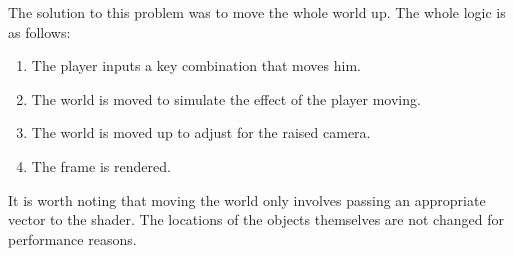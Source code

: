The solution to this problem was to move the whole world up.
The whole logic is as follows:
\begin{enumerate}
    \item The player inputs a key combination that moves him.
    \item The world is moved to simulate the effect of the player moving.
    \item The world is moved up to adjust for the raised camera.
    \item The frame is rendered.
\end{enumerate}

It is worth noting that moving the world only involves passing an appropriate vector to the shader.
The locations of the objects themselves are not changed for performance reasons.